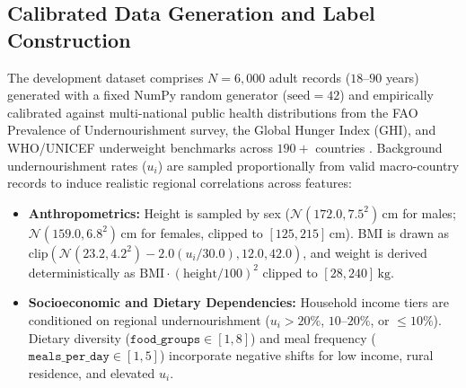 \documentclass[conference]{IEEEtran}
\begin{document}
\subsection{Calibrated Data Generation and Label Construction}
The development dataset comprises $N = 6{,}000$ adult records ($18$--$90$ years) generated with a fixed NumPy random generator ($\text{seed} = 42$) and empirically calibrated against multi-national public health distributions from the FAO Prevalence of Undernourishment survey, the Global Hunger Index (GHI), and WHO/UNICEF underweight benchmarks across $190+$ countries \cite{fao2023sofi, who2000obesity}. Background undernourishment rates ($u_i$) are sampled proportionally from valid macro-country records to induce realistic regional correlations across features:
\begin{itemize}
    \item \textbf{Anthropometrics:} Height is sampled by sex ($\mathcal{N}(172.0, 7.5^2)\,\text{cm}$ for males; $\mathcal{N}(159.0, 6.8^2)\,\text{cm}$ for females, clipped to $[125, 215]\,\text{cm}$). BMI is drawn as $\text{clip}(\mathcal{N}(23.2, 4.2^2) - 2.0(u_i/30.0), 12.0, 42.0)$, and weight is derived deterministically as $\text{BMI} \cdot (\text{height}/100)^2$ clipped to $[28, 240]\,\text{kg}$.
    \item \textbf{Socioeconomic and Dietary Dependencies:} Household income tiers are conditioned on regional undernourishment ($u_i > 20\%$, $10$--$20\%$, or $\le 10\%$). Dietary diversity ($\texttt{food\_groups} \in [1, 8]$) and meal frequency ($\texttt{meals\_per\_day} \in [1, 5]$) incorporate negative shifts for low income, rural residence, and elevated $u_i$.
\end{itemize}
\end{document}
